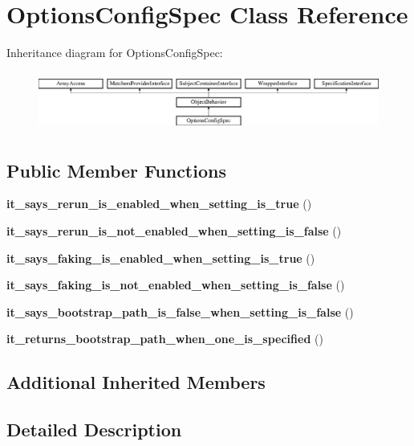 \section{Options\+Config\+Spec Class Reference}
\label{classspec_1_1_php_spec_1_1_config_1_1_options_config_spec}
Inheritance diagram for Options\+Config\+Spec\+:\begin{figure}[H]
\begin{center}
\leavevmode
\includegraphics[height=1.953488cm]{classspec_1_1_php_spec_1_1_config_1_1_options_config_spec}
\end{center}
\end{figure}
\subsection*{Public Member Functions}
\begin{DoxyCompactItemize}
\item 
{\bf it\+\_\+says\+\_\+rerun\+\_\+is\+\_\+enabled\+\_\+when\+\_\+setting\+\_\+is\+\_\+true} ()
\item 
{\bf it\+\_\+says\+\_\+rerun\+\_\+is\+\_\+not\+\_\+enabled\+\_\+when\+\_\+setting\+\_\+is\+\_\+false} ()
\item 
{\bf it\+\_\+says\+\_\+faking\+\_\+is\+\_\+enabled\+\_\+when\+\_\+setting\+\_\+is\+\_\+true} ()
\item 
{\bf it\+\_\+says\+\_\+faking\+\_\+is\+\_\+not\+\_\+enabled\+\_\+when\+\_\+setting\+\_\+is\+\_\+false} ()
\item 
{\bf it\+\_\+says\+\_\+bootstrap\+\_\+path\+\_\+is\+\_\+false\+\_\+when\+\_\+setting\+\_\+is\+\_\+false} ()
\item 
{\bf it\+\_\+returns\+\_\+bootstrap\+\_\+path\+\_\+when\+\_\+one\+\_\+is\+\_\+specified} ()
\end{DoxyCompactItemize}
\subsection*{Additional Inherited Members}


\subsection{Detailed Description}


